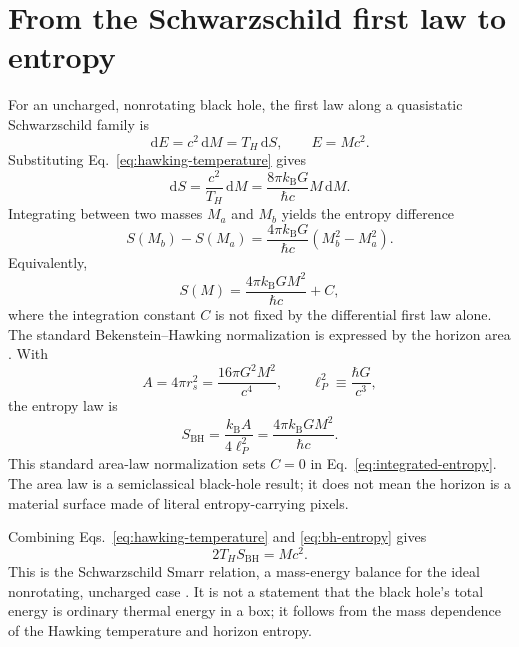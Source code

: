 \documentclass[12pt]{article}
\begin{document}
\section{From the Schwarzschild first law to entropy}

For an uncharged, nonrotating black hole, the first law along a quasistatic Schwarzschild family is
\begin{equation}
  \mathrm{d}E=c^2\,\mathrm{d}M=T_H\,\mathrm{d}S,
  \qquad E=Mc^2.
  \label{eq:first-law}
\end{equation}
Substituting Eq.~\eqref{eq:hawking-temperature} gives
\begin{equation}
  \mathrm{d}S
  =\frac{c^2}{T_H}\,\mathrm{d}M
  =\frac{8\pi k_{\mathrm B}G}{\hbar c}M\,\mathrm{d}M.
  \label{eq:entropy-differential}
\end{equation}
Integrating between two masses $M_a$ and $M_b$ yields the entropy difference
\begin{equation}
  S(M_b)-S(M_a)
  =\frac{4\pi k_{\mathrm B}G}{\hbar c}
   \left(M_b^2-M_a^2\right).
  \label{eq:entropy-difference}
\end{equation}
Equivalently,
\begin{equation}
  S(M)=\frac{4\pi k_{\mathrm B}GM^2}{\hbar c}+C,
  \label{eq:integrated-entropy}
\end{equation}
where the integration constant $C$ is not fixed by the differential first law alone. The standard Bekenstein--Hawking normalization is expressed by the horizon area \cite{Bekenstein,BardeenCarterHawking,Hawking}. With
\begin{equation}
  A=4\pi r_s^2=\frac{16\pi G^2M^2}{c^4},
  \qquad
  \ell_P^2\equiv\frac{\hbar G}{c^3},
  \label{eq:area-planck-length}
\end{equation}
the entropy law is
\begin{equation}
  S_{\mathrm{BH}}=\frac{k_{\mathrm B}A}{4\ell_P^2}
  =\frac{4\pi k_{\mathrm B}GM^2}{\hbar c}.
  \label{eq:bh-entropy}
\end{equation}
This standard area-law normalization sets $C=0$ in Eq.~\eqref{eq:integrated-entropy}. The area law is a semiclassical black-hole result; it does not mean the horizon is a material surface made of literal entropy-carrying pixels.

Combining Eqs.~\eqref{eq:hawking-temperature} and \eqref{eq:bh-entropy} gives
\begin{equation}
  2T_H S_{\mathrm{BH}}=Mc^2.
  \label{eq:smarr}
\end{equation}
This is the Schwarzschild Smarr relation, a mass-energy balance for the ideal nonrotating, uncharged case \cite{Smarr}. It is not a statement that the black hole's total energy is ordinary thermal energy in a box; it follows from the mass dependence of the Hawking temperature and horizon entropy.
\end{document}
